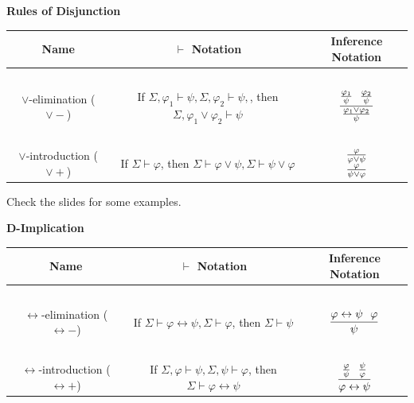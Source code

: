 \documentclass[english, 11pt]{article}
\begin{document}
\begin{defn}
    \begin{center}\textbf{Rules of Disjunction}\end{center}
    \begin{center}
    \begin{tabular}{c | c | c }
      Name & $\vdash$ Notation & Inference Notation \\
      \hline
      \hline
      \ &&\\
      $\lor$-elimination ($\lor-$) & If $\Sigma, \varphi_1 \vdash \psi, \Sigma, \varphi_2 \vdash \psi,$, then $\Sigma, \varphi_1 \lor \varphi_2 \vdash \psi$ & $\displaystyle \frac{\frac{\varphi_1}{\psi} \ \ \frac{\varphi_2}{\psi}}{\frac{\varphi_1 \lor \varphi_2}{\psi}}$ \\[3ex]
      \hline
      \hline
      \ &&\\
      $\lor$-introduction ($\lor+$) & If $\Sigma \vdash \varphi$, then $\Sigma \vdash \varphi \lor \psi, \Sigma \vdash \psi \lor \varphi$ & $\displaystyle \begin{array}{c}\frac{\varphi}{\varphi\lor \psi} \\ \frac{\varphi}{\psi \lor \varphi}\end{array}$ \\[3ex]
      \hline
      \hline
    \end{tabular}
    \end{center}

    Check the slides for some examples.

    \begin{center}\textbf{D-Implication}\end{center}
    \begin{center}
    \begin{tabular}{c | c | c }
      Name & $\vdash$ Notation & Inference Notation \\
      \hline
      \hline
      \ &&\\
      $\leftrightarrow$-elimination ($\leftrightarrow-$) & If $\Sigma \vdash \varphi \leftrightarrow \psi, \Sigma \vdash \varphi$, then $\Sigma \vdash \psi$ & $\displaystyle \frac{\varphi \leftrightarrow \psi \ \ \varphi}{\psi}$ \\[3ex]
      \hline
      \hline
      \ &&\\
      $\leftrightarrow$-introduction ($\leftrightarrow+$) & If $\Sigma, \varphi \vdash \psi, \Sigma, \psi \vdash \varphi$, then $\Sigma \vdash \varphi \leftrightarrow \psi$ & $\displaystyle \frac{\frac{\varphi}{\psi} \ \ \frac{\psi}{\varphi}}{\varphi \leftrightarrow \psi}$ \\[3ex]
      \hline
      \hline
    \end{tabular}
    \end{center}

  \end{defn}
\end{document}
